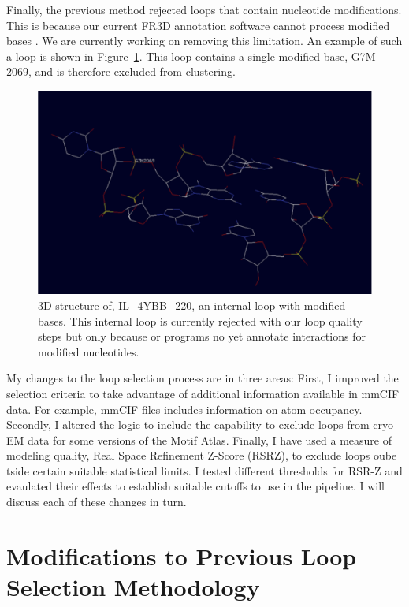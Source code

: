 Finally, the previous method rejected loops that contain nucleotide
modifications. This is because our current FR3D annotation software cannot
process modified bases \cite{Sarver2008a}. We are currently working on removing
this limitation. An example of such a loop is shown in
Figure~\ref{fig:modified-loop}. This loop contains a single modified base, G7M
2069, and is therefore excluded from clustering.

\begin{figure}
  \includegraphics[width=\textwidth]{chapter-5/figs/loops/IL-4YBB-220}
  \caption{3D structure of, IL\_4YBB\_220, an internal loop with modified bases.
  This internal loop is currently rejected with our loop quality steps but only
  because or programs no yet annotate interactions for modified nucleotides.}
  \label{fig:modified-loop}
\end{figure}

My changes to the loop selection process are in three areas: First, I improved
the selection criteria to take advantage of additional information available in
mmCIF data. For example, mmCIF files includes information on atom occupancy.
Secondly, I altered the logic to include the capability to exclude loops from
cryo-EM data for some versions of the Motif Atlas. Finally, I have used a
measure of modeling quality, Real Space Refinement Z-Score (RSRZ), to exclude
loops oube tside certain suitable statistical limits. I tested different thresholds for
RSR-Z and evaulated their effects to establish suitable cutoffs to use in the
pipeline. I will discuss each of these changes in turn.

\section{Modifications to Previous Loop Selection Methodology}

